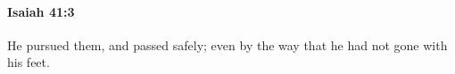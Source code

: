 
		\paragraph{Isaiah 41:3} %
			\label{ISAIAH-41-3}

			He pursued them, and passed safely; even by the way that he had not gone with his feet.


